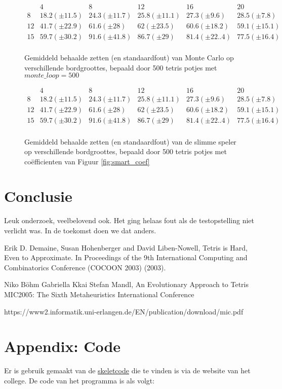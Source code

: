 \documentclass[10pt]{article}
\begin{document}
\begin{figure}
$$\begin{array}{l||c|c|c|c|c}
	    & 4 			& 8 			   & 12 			& 16 			 & 20 \\ 
	\hline\hline
	8  & 18.2 (\pm 11.5) 	& 24.3 (\pm 11.7) & 25.8 (\pm 11.1)  & 27.3 (\pm 9.6)  & 28.5 (\pm 7.8) \\
	12 & 41.7 (\pm 22.9) & 61.6 (\pm 28)    & 62 (\pm 23.5)     & 60.6 (\pm 18.2) & 59.1 (\pm 15.1)  \\
	15 & 59.7 (\pm 30.2) & 91.6 (\pm 41.8) & 86.7 (\pm 29)     & 81.4 (\pm 22..4) & 77.5 (\pm 16.4) \\
\end{array}$$
\caption{Gemiddeld behaalde zetten (en standaardfout) van Monte Carlo op verschillende bordgroottes, bepaald door 500 tetris potjes met $monte\_loop=500$}
\end{figure}

\begin{figure}
$$\begin{array}{l||c|c|c|c|c}
	    & 4 			& 8 			   & 12 			& 16 			 & 20 \\ 
	\hline\hline
	8  & 18.2 (\pm 11.5) 	& 24.3 (\pm 11.7) & 25.8 (\pm 11.1)  & 27.3 (\pm 9.6)  & 28.5 (\pm 7.8) \\
	12 & 41.7 (\pm 22.9) & 61.6 (\pm 28)    & 62 (\pm 23.5)     & 60.6 (\pm 18.2) & 59.1 (\pm 15.1)  \\
	15 & 59.7 (\pm 30.2) & 91.6 (\pm 41.8) & 86.7 (\pm 29)     & 81.4 (\pm 22..4) & 77.5 (\pm 16.4) \\
\end{array}$$
\caption{Gemiddeld behaalde zetten (en standaardfout) van de slimme speler op verschillende bordgroottes, bepaald door 500 tetris potjes met co\"efficienten van Figuur \ref{fig:smart_coef}}
\end{figure}

\section{Conclusie}

Leuk onderzoek, veelbelovend ook. Het ging helaas 
fout als de testopstelling niet verlicht was.
In de toekomst doen we dat anders.

\begin{thebibliography}{XX}

Erik D. Demaine, Susan Hohenberger and David Liben-Nowell, Tetris is
Hard, Even to Approximate. In Proceedings of the 9th International Computing and
Combinatorics Conference (COCOON 2003) (2003).

Niko B\"{o}hm Gabriella Kkai Stefan Mandl,
An Evolutionary Approach to Tetris
MIC2005: The Sixth Metaheuristics International Conference

https://www2.informatik.uni-erlangen.de/EN/publication/download/mic.pdf

\end{thebibliography}

\section*{Appendix: Code}

Er is gebruik gemaakt van de \href{http://www.liacs.leidenuniv.nl/~kosterswa/AI/iets.cc}{\underline{skeletcode}} die te vinden is via
de website van het college.
De code van het programma is als volgt:

\smallskip
\end{document}
